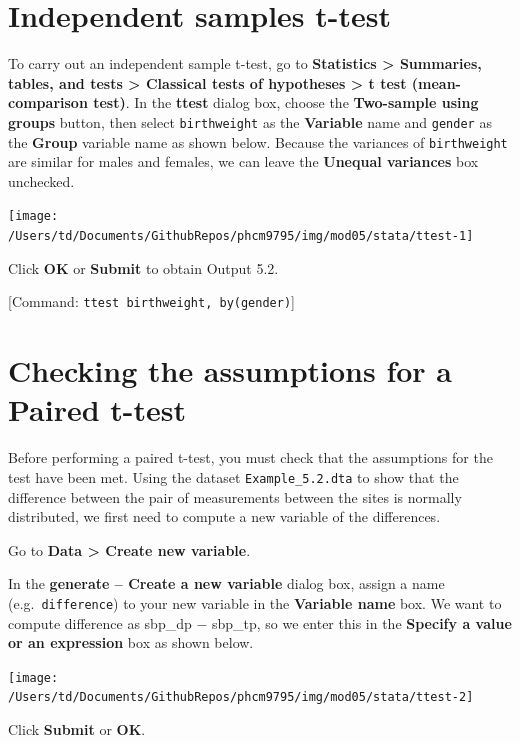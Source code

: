 \documentclass[
]{memoir}
\begin{document}
\hypertarget{independent-samples-t-test-1}{%
\section{Independent samples t-test}\label{independent-samples-t-test-1}}

To carry out an independent sample t-test, go to \textbf{Statistics \textgreater{} Summaries, tables, and tests \textgreater{} Classical tests of hypotheses \textgreater{} t test (mean-comparison test)}. In the \textbf{ttest} dialog box, choose the \textbf{Two-sample using groups} button, then select \texttt{birthweight} as the \textbf{Variable} name and \texttt{gender} as the \textbf{Group} variable name as shown below. Because the variances of \texttt{birthweight} are similar for males and females, we can leave the \textbf{Unequal variances} box unchecked.

\texttt{[image: /Users/td/Documents/GithubRepos/phcm9795/img/mod05/stata/ttest-1]}

Click \textbf{OK} or \textbf{Submit} to obtain Output 5.2.

{[}Command: \texttt{ttest\ birthweight,\ by(gender)}{]}

\hypertarget{checking-the-assumptions-for-a-paired-t-test}{%
\section{Checking the assumptions for a Paired t-test}\label{checking-the-assumptions-for-a-paired-t-test}}

Before performing a paired t-test, you must check that the assumptions for the test have been met. Using the dataset \texttt{Example\_5.2.dta} to show that the difference between the pair of measurements between the sites is normally distributed, we first need to compute a new variable of the differences.

Go to \textbf{Data \textgreater{} Create new variable}.

In the \textbf{generate -- Create a new variable} dialog box, assign a name (e.g.~\texttt{difference}) to your new variable in the \textbf{Variable name} box. We want to compute difference as sbp\_dp − sbp\_tp, so we enter this in the \textbf{Specify a value or an expression} box as shown below.

\texttt{[image: /Users/td/Documents/GithubRepos/phcm9795/img/mod05/stata/ttest-2]}

Click \textbf{Submit} or \textbf{OK}.
\end{document}
